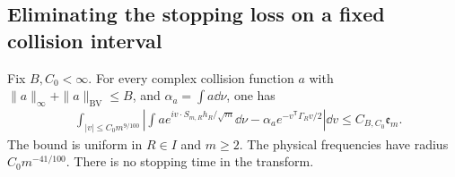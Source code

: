 \subsection{Eliminating the stopping loss on a fixed collision interval}
\begin{theorem}
\label{thm:wide-collision-band}
Fix $B,C_0<\infty$. For every complex collision function $a$ with
$\|a\|_\infty+\|a\|_{\mathrm{BV}}\le B$, and
$\alpha_a=\int a\dd\nu$, one has
\begin{align}
 &\int_{|v|\le C_0m^{9/100}}
 \left|\int a e^{iv\cdot S_{m,R}h_R/\sqrt m}\dd\nu
                   -\alpha_a e^{-v^{\mathsf T}\Gamma_Rv/2}\right|\dd v
 \le C_{B,C_0}\mathfrak e_m .
 \label{eq:wide-collision-band}
\end{align}
The bound is uniform in $R\in I$ and $m\ge2$. The physical frequencies
have radius $C_0m^{-41/100}$. There is no stopping time in the transform.
\end{theorem}
